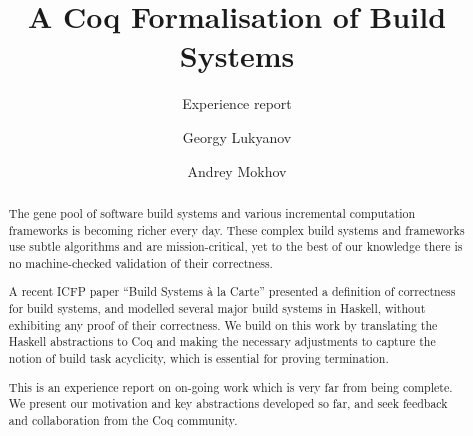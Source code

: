 \documentclass[sigplan,review]{acmart}\settopmatter{printfolios=true,printccs=false,printacmref=false}
\begin{document}
\title[]{A Coq Formalisation of Build Systems}         %
\subtitle{Experience report}                     %


\author{Georgy Lukyanov}

\author{Andrey Mokhov}

\begin{abstract}
The gene pool of software build systems and various incremental computation
frameworks is becoming richer every day. These complex build systems and
frameworks use subtle algorithms and are mission-critical, yet to the best of
our knowledge there is no machine-checked validation of their correctness.

A recent ICFP paper ``Build Systems \`a la Carte'' presented a definition of
correctness for build systems, and modelled several major build systems in
Haskell, without exhibiting any proof of their correctness. We build on this
work by translating the Haskell abstractions to Coq and making the necessary
adjustments to capture the notion of build task acyclicity, which is essential
for proving termination.

This is an experience report on on-going work which is very far from being
complete. We present our motivation and key abstractions developed so far, and
seek feedback and collaboration from the Coq community.
\end{abstract}
\end{document}
